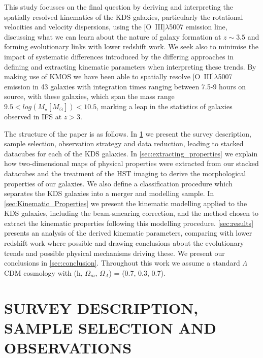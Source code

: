 \documentclass[fleqn,usenatbib]{mn2e}
\begin{document}
This study focusses on the final question by deriving and interpreting the spatially resolved kinematics of the KDS galaxies, particularly the rotational velocities and velocity dispersions, using the [O~{\sc III}]$\lambda$5007 emission line, discussing what we can learn about the nature of galaxy formation at $z \sim 3.5$ and forming evolutionary links with lower redshift work.
We seek also to minimise the impact of systematic differences introduced by the differing approaches in defining and extracting kinematic parameters when interpreting these trends.  
By making use of KMOS we have been able to spatially resolve [O~{\sc III}]$\lambda$5007 emission in 43 galaxies with integration times ranging between 7.5-9 hours on source, with these galaxies, which span the mass range $9.5 < log(M_{\star}[M_{\odot}]) < 10.5$, marking a leap in the statistics of galaxies observed in IFS at $z > 3$.

The structure of the paper is as follows. In \cref{sec:Survey_and_data} we present the survey description, sample selection, observation strategy and data reduction, leading to stacked datacubes for each of the KDS galaxies.
In \cref{sec:extracting_properties} we explain how two-dimensional maps of physical properties were extracted from our stacked datacubes and the treatment of the HST imaging to derive the morphological properties of our galaxies.
We also define a classification procedure which separates the KDS galaxies into a merger and modelling sample.
In \cref{sec:Kinematic_Properties} we present the kinematic modelling applied to the KDS galaxies, including the beam-smearing correction, and the method chosen to extract the kinematic properties following this modelling procedure.
\cref{sec:results} presents an analysis of the derived kinematic parameters, comparing with lower redshift work where possible and drawing conclusions about the evolutionary trends and possible physical mechanisms driving these.
We present our conclusions in \cref{sec:conclusion}.
Throughout this work we assume a standard $\Lambda$CDM cosmology with (h, $\Omega_{m}$, $\Omega_{\Lambda}$) = (0.7, 0.3, 0.7). 

\section{SURVEY DESCRIPTION, SAMPLE SELECTION AND OBSERVATIONS}\label{sec:Survey_and_data}
\end{document}
